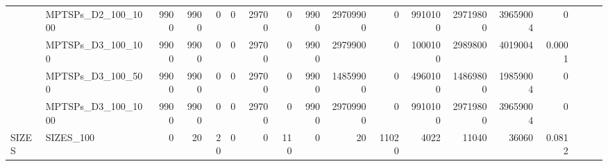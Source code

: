 \begin{landscape}
\begin{longtable}[c]{llrrrrrrrrrrrrrlll}
		& MPTSPs\_D2\_100\_1000        & 9900                        & 9900                       & 0                          & 0                           & 29700                      & 0                          & 9900                       & 29709900                  & 0                         & 9910100                    & 29719800                   & 39659004                       & 0                             &                          &                          &                          \\
		& MPTSPs\_D3\_100\_100         & 9900                        & 9900                       & 0                          & 0                           & 29700                      & 0                          & 9900                       & 2979900                   & 0                         & 1000100                    & 2989800                    & 4019004                        & 0.0001                        &                          &                          &                          \\
		& MPTSPs\_D3\_100\_500         & 9900                        & 9900                       & 0                          & 0                           & 29700                      & 0                          & 9900                       & 14859900                  & 0                         & 4960100                    & 14869800                   & 19859004                       & 0                             &                          &                          &                          \\
		& MPTSPs\_D3\_100\_1000        & 9900                        & 9900                       & 0                          & 0                           & 29700                      & 0                          & 9900                       & 29709900                  & 0                         & 9910100                    & 29719800                   & 39659004                       & 0                             &                          &                          &                          \\ \hline
		\multirow{5}{*}{SIZES}      & SIZES\_100                   & 0                           & 20                         & 20                         & 0                           & 0                          & 110                        & 0                          & 20                        & 11020                     & 4022                       & 11040                      & 36060                          & 0.0812                        &                          &                          &                          \\

\end{longtable}
\end{landscape}
